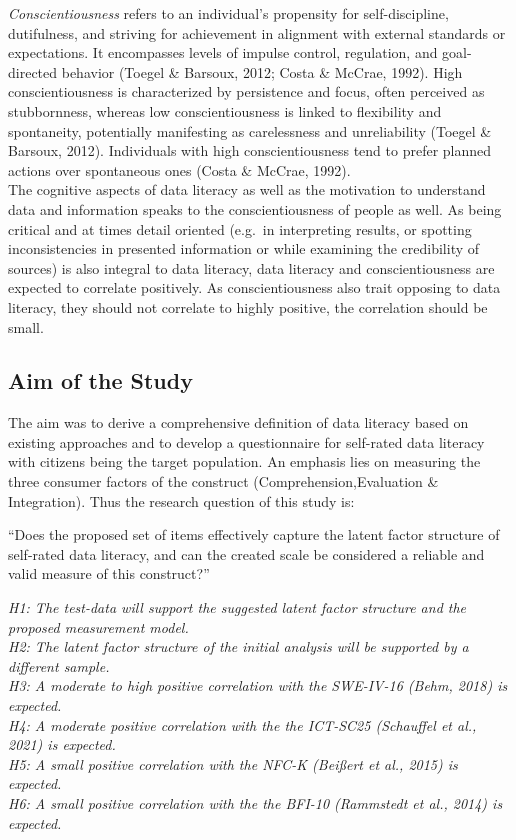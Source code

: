 \documentclass[
  12pt,
  a4paper,
  twoside]{article}
\begin{document}
\emph{Conscientiousness} refers to an individual's propensity for self-discipline, dutifulness, and striving for achievement in alignment with external standards or expectations. It encompasses levels of impulse control, regulation, and goal-directed behavior (Toegel \& Barsoux, 2012; Costa \& McCrae, 1992). High conscientiousness is characterized by persistence and focus, often perceived as stubbornness, whereas low conscientiousness is linked to flexibility and spontaneity, potentially manifesting as carelessness and unreliability (Toegel \& Barsoux, 2012). Individuals with high conscientiousness tend to prefer planned actions over spontaneous ones (Costa \& McCrae, 1992).\\
The cognitive aspects of data literacy as well as the motivation to understand data and information speaks to the conscientiousness of people as well. As being critical and at times detail oriented (e.g.~in interpreting results, or spotting inconsistencies in presented information or while examining the credibility of sources) is also integral to data literacy, data literacy and conscientiousness are expected to correlate positively. As conscientiousness also trait opposing to data literacy, they should not correlate to highly positive, the correlation should be small.

\subsection{Aim of the Study}\label{aim-of-the-study}

The aim was to derive a comprehensive definition of data literacy based on existing approaches and to develop a questionnaire for self-rated data literacy with citizens being the target population. An emphasis lies on measuring the three consumer factors of the construct (Comprehension,Evaluation \& Integration). Thus the research question of this study is:

``Does the proposed set of items effectively capture the latent factor structure of self-rated data literacy, and can the created scale be considered a reliable and valid measure of this construct?''

\emph{H1: The test-data will support the suggested latent factor structure and the proposed measurement model.}\\
\emph{H2: The latent factor structure of the initial analysis will be supported by a different sample.}\\
\emph{H3: A moderate to high positive correlation with the SWE-IV-16 (Behm, 2018) is expected.}\\
\emph{H4: A moderate positive correlation with the the ICT-SC25 (Schauffel et al., 2021) is expected.}\\
\emph{H5: A small positive correlation with the NFC-K (Beißert et al., 2015) is expected.}\\
\emph{H6: A small positive correlation with the the BFI-10 (Rammstedt et al., 2014) is expected.}
\end{document}
